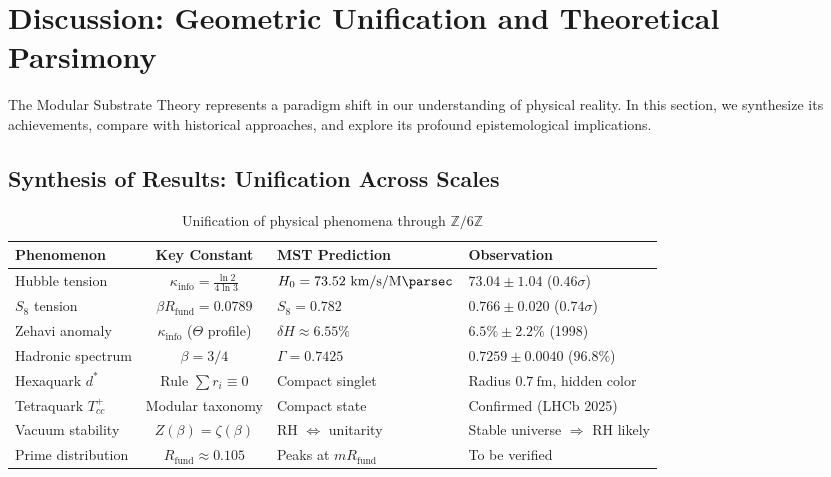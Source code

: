\documentclass[11pt, a4paper]{article}
\theoremstyle{plain}
\theoremstyle{definition}
\newcommand{\Zmod}{\mathbb{Z}/6\mathbb{Z}}
\newcommand{\Rfactor}{R_{\text{fund}}}
\newcommand{\Kinfo}{\kappa_{\text{info}}}
\begin{document}

\section{Discussion: Geometric Unification and Theoretical Parsimony}
\label{sec:discussion}

The Modular Substrate Theory represents a paradigm shift in our understanding of physical reality. In this section, we synthesize its achievements, compare with historical approaches, and explore its profound epistemological implications.

\subsection{Synthesis of Results: Unification Across Scales}

\begin{table}[H]
\centering
\caption{Unification of physical phenomena through $\Zmod$}
\label{tab:unification_results}
\begin{tabular}{p{4cm}cp{3cm}p{3cm}}
\toprule
\textbf{Phenomenon} & \textbf{Key Constant} & \textbf{MST Prediction} & \textbf{Observation} \\
\midrule
Hubble tension & $\Kinfo = \frac{\ln 2}{4\ln 3}$ & $H_0 = 73.52\ \si{\kilo\meter\per\second\per\mega\parsec}$ & $73.04 \pm 1.04$ ($0.46\sigma$) \\
$S_8$ tension & $\beta\Rfactor = 0.0789$ & $S_8 = 0.782$ & $0.766 \pm 0.020$ ($0.74\sigma$) \\
Zehavi anomaly & $\Kinfo$ ($\Theta$ profile) & $\delta H \approx 6.55\%$ & $6.5\% \pm 2.2\%$ (1998) \\
\addlinespace
Hadronic spectrum & $\beta = 3/4$ & $\Gamma = 0.7425$ & $0.7259 \pm 0.0040$ ($96.8\%$) \\
Hexaquark $d^*$ & Rule $\sum r_i \equiv 0$ & Compact singlet & Radius $0.7\ \si{\femto\meter}$, hidden color \\
Tetraquark $T_{cc}^+$ & Modular taxonomy & Compact state & Confirmed (LHCb 2025) \\
\addlinespace
Vacuum stability & $Z(\beta)=\zeta(\beta)$ & RH $\Leftrightarrow$ unitarity & Stable universe $\Rightarrow$ RH likely \\
Prime distribution & $\Rfactor \approx 0.105$ & Peaks at $m\Rfactor$ & To be verified \\
\bottomrule
\end{tabular}
\end{table}
\end{document}
